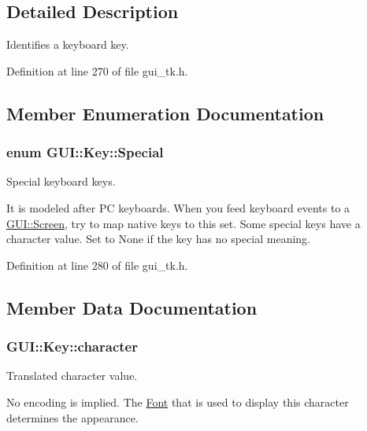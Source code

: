 \subsection{Detailed Description}
Identifies a keyboard key. 

Definition at line 270 of file gui\-\_\-tk.\-h.



\subsection{Member Enumeration Documentation}
\hypertarget{classGUI_1_1Key_a9d3f8dbfc08f0189dbb8aa5a20b9ea99}{
\subsubsection[{Special}]{\setlength{\rightskip}{0pt plus 5cm}enum {\bf G\-U\-I\-::\-Key\-::\-Special}}}\label{classGUI_1_1Key_a9d3f8dbfc08f0189dbb8aa5a20b9ea99}


Special keyboard keys. 

It is modeled after P\-C keyboards. When you feed keyboard events to a \hyperlink{classGUI_1_1Screen}{G\-U\-I\-::\-Screen}, try to map native keys to this set. Some special keys have a character value. Set to {\ttfamily None} if the key has no special meaning. 

Definition at line 280 of file gui\-\_\-tk.\-h.



\subsection{Member Data Documentation}
\hypertarget{classGUI_1_1Key_a08e3432cc2bc3ceded36c3405fca4353}{
\subsubsection[{character}]{ {\bf G\-U\-I\-::\-Key\-::character}}}\label{classGUI_1_1Key_a08e3432cc2bc3ceded36c3405fca4353}


Translated character value. 

No encoding is implied. The \hyperlink{classGUI_1_1Font}{Font} that is used to display this character determines the appearance. 

